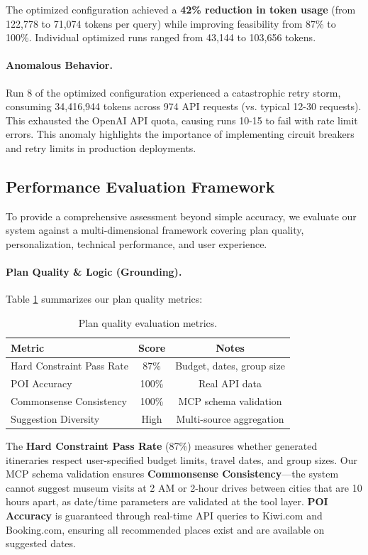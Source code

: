 \documentclass[10pt,twocolumn]{article}
\begin{document}
The optimized configuration achieved a \textbf{42\% reduction in token usage} (from 122,778 to 71,074 tokens per query) while improving feasibility from 87\% to 100\%. Individual optimized runs ranged from 43,144 to 103,656 tokens.

\paragraph{Anomalous Behavior.}
Run 8 of the optimized configuration experienced a catastrophic retry storm, consuming 34,416,944 tokens across 974 API requests (vs. typical 12-30 requests). This exhausted the OpenAI API quota, causing runs 10-15 to fail with rate limit errors. This anomaly highlights the importance of implementing circuit breakers and retry limits in production deployments.

\FloatBarrier
\subsection{Performance Evaluation Framework}

To provide a comprehensive assessment beyond simple accuracy, we evaluate our system against a multi-dimensional framework covering plan quality, personalization, technical performance, and user experience.

\paragraph{Plan Quality \& Logic (Grounding).}
Table \ref{tab:plan_quality} summarizes our plan quality metrics:

\begin{table}[h]
\centering
\small
\begin{tabular}{lcc}
\toprule
\textbf{Metric} & \textbf{Score} & \textbf{Notes} \\
\midrule
Hard Constraint Pass Rate & 87\% & Budget, dates, group size \\
POI Accuracy & 100\% & Real API data \\
Commonsense Consistency & 100\% & MCP schema validation \\
Suggestion Diversity & High & Multi-source aggregation \\
\bottomrule
\end{tabular}
\caption{Plan quality evaluation metrics.}
\label{tab:plan_quality}
\end{table}

The \textbf{Hard Constraint Pass Rate} (87\%) measures whether generated itineraries respect user-specified budget limits, travel dates, and group sizes. Our MCP schema validation ensures \textbf{Commonsense Consistency}---the system cannot suggest museum visits at 2 AM or 2-hour drives between cities that are 10 hours apart, as date/time parameters are validated at the tool layer. \textbf{POI Accuracy} is guaranteed through real-time API queries to Kiwi.com and Booking.com, ensuring all recommended places exist and are available on suggested dates.
\end{document}
